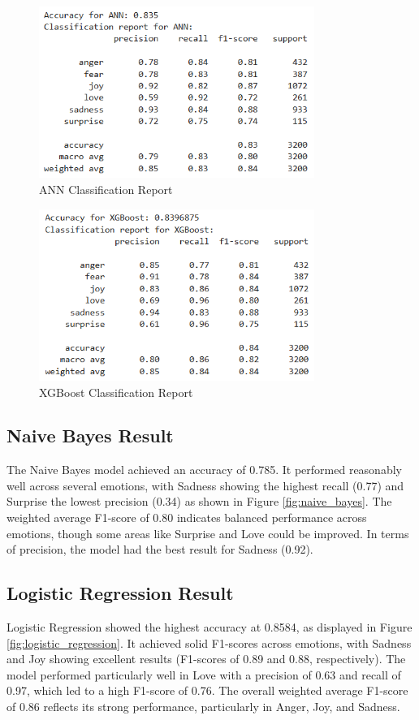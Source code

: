 \begin{figure}[h!]
\centering
\includegraphics[width=0.8\textwidth]{ann_result.png}
\caption{ANN Classification Report}
\label{fig:ann}
\end{figure}

\begin{figure}[h!]
\centering
\includegraphics[width=0.8\textwidth]{xgboost_result.png}
\caption{XGBoost Classification Report}
\label{fig:xgboost}
\end{figure}

\clearpage

\subsection{Naive Bayes Result}
The Naive Bayes model achieved an accuracy of 0.785. It performed reasonably well across several emotions, with Sadness showing the highest recall (0.77) and Surprise the lowest precision (0.34) as shown in Figure \ref{fig:naive_bayes}. The weighted average F1-score of 0.80 indicates balanced performance across emotions, though some areas like Surprise and Love could be improved. In terms of precision, the model had the best result for Sadness (0.92).

\subsection{Logistic Regression Result}
Logistic Regression showed the highest accuracy at 0.8584, as displayed in Figure \ref{fig:logistic_regression}. It achieved solid F1-scores across emotions, with Sadness and Joy showing excellent results (F1-scores of 0.89 and 0.88, respectively). The model performed particularly well in Love with a precision of 0.63 and recall of 0.97, which led to a high F1-score of 0.76. The overall weighted average F1-score of 0.86 reflects its strong performance, particularly in Anger, Joy, and Sadness.

